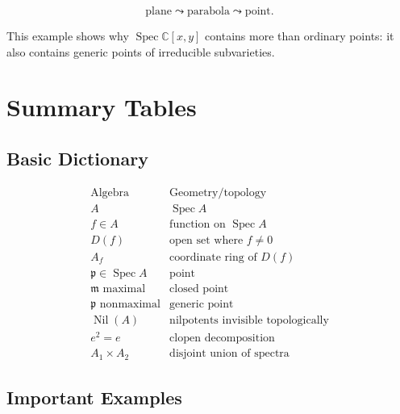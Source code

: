 \documentclass[12pt,a4paper]{article}
\newcommand{\C}{\mathbb{C}}
\newcommand{\Spec}{\operatorname{Spec}}
\newcommand{\Nil}{\operatorname{Nil}}
\newcommand{\mfp}{\mathfrak p}
\newcommand{\mfm}{\mathfrak m}
\begin{document}
\[
\text{plane}
\leadsto
\text{parabola}
\leadsto
\text{point}.
\]

\begin{center}
\end{center}

This example shows why \(\Spec\C[x,y]\) contains more than ordinary points:
it also contains generic points of irreducible subvarieties.

\section{Summary Tables}

\subsection{Basic Dictionary}

\[
\begin{array}{c|c}
	\text{Algebra} & \text{Geometry/topology}\\
	\hline
	A & \Spec A\\
	f\in A & \text{function on }\Spec A\\
	D(f) & \text{open set where }f\neq 0\\
	A_f & \text{coordinate ring of }D(f)\\
	\mfp\in\Spec A & \text{point}\\
	\mfm\text{ maximal} & \text{closed point}\\
	\mfp\text{ nonmaximal} & \text{generic point}\\
	\Nil(A) & \text{nilpotents invisible topologically}\\
	e^2=e & \text{clopen decomposition}\\
	A_1\times A_2 & \text{disjoint union of spectra}
\end{array}
\]

\subsection{Important Examples}
\end{document}
